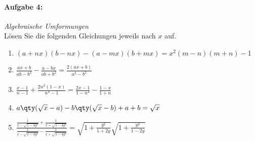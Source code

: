 %
\paragraph{Aufgabe 4: } \emph{Algebraische Umformungen}\\[0.2cm]
Lösen Sie die folgenden Gleichungen jeweils nach $x$ auf.

\begin{enumerate}[label=(\alph*)]
    \item $(a+nx)(b-nx)-(a-mx)(b+mx)=x^2(m-n)(m+n)-1$
    \item $\frac{ax+b}{ab-b^2}-\frac{a-bx}{ab+b^2}=\frac{2(ax+b)}{a^2-b^2}$
    \item $\frac{x-1}{n-1}+\frac{2n^2(1-x)}{n^4-1}=\frac{2x-1}{1-n^4}-\frac{1-x}{1+n}$
    \item $a\qty(\sqrt{x}-a)-b\qty(\sqrt{x}-b)+a+b=\sqrt{x}$
    \item $\frac{\frac{1}{x-\sqrt{1-4y^2}}+\frac{1}{x+\sqrt{1-4y^2}}}{\frac{1}{x-\sqrt{1-4y^2}}-\frac{1}{x+\sqrt{1-4y^2}}}=\sqrt{1+\frac{y^2}{1+2y}}\sqrt{1+\frac{y^2}{1-2y}}$
\end{enumerate}